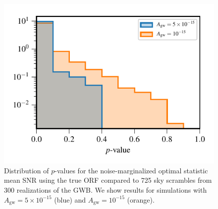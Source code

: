 \documentclass[twocolumn,aps,prd,superscriptaddress]{revtex4-1}
\newcommand{\Agw}{\ensuremath{A_\mathrm{gw}}}
\begin{document}
\begin{figure}[tb]
	\includegraphics[width=0.9\columnwidth]{plots/optstat_scrambled.pdf}
	\caption{Distribution of $p$-values for the noise-marginalized optimal statistic mean SNR 
			using the true ORF compared to 725 sky scrambles from 300 realizations of the GWB. 
			We show results for simulations with $\Agw=5\times10^{-15}$ (blue) and $\Agw=10^{-15}$ (orange).}
	\label{fig:skyscrambles_pvalues}
\end{figure}


\end{document}

